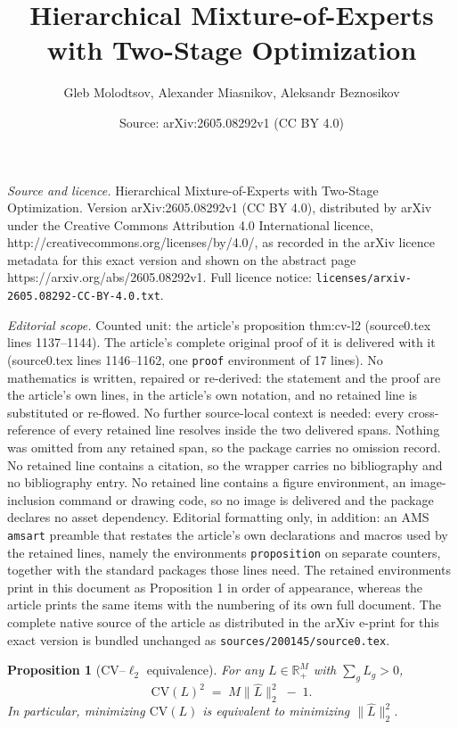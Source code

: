 \documentclass[10pt,a4paper]{amsart}
\title{Hierarchical Mixture-of-Experts with Two-Stage Optimization}
\author{Gleb Molodtsov, Alexander Miasnikov, Aleksandr Beznosikov}
\date{Source: arXiv:2605.08292v1 (CC BY 4.0)}
\newtheorem{proposition}{Proposition}
\begin{document}
\maketitle

\noindent\emph{Source and licence.} Hierarchical Mixture-of-Experts with Two-Stage Optimization. Version arXiv:2605.08292v1 (CC BY 4.0), distributed by arXiv under the Creative Commons Attribution 4.0 International licence, http://creativecommons.org/licenses/by/4.0/, as recorded in the arXiv licence metadata for this exact version and shown on the abstract page https://arxiv.org/abs/2605.08292v1. Full licence notice: \texttt{licenses/arxiv-2605.08292-CC-BY-4.0.txt}.\par\smallskip

\noindent\textit{Editorial scope.} Counted unit: the article's proposition thm:cv-l2 (source0.tex lines 1137--1144). The article's complete original proof of it is delivered with it (source0.tex lines 1146--1162, one \texttt{proof} environment of 17 lines). No mathematics is written, repaired or re-derived: the statement and the proof are the article's own lines, in the article's own notation, and no retained line is substituted or re-flowed.  No further source-local context is needed: every cross-reference of every retained line resolves inside the two delivered spans.  Nothing was omitted from any retained span, so the package carries no omission record.  No retained line contains a citation, so the wrapper carries no bibliography and no bibliography entry.  No retained line contains a figure environment, an image-inclusion command or drawing code, so no image is delivered and the package declares no asset dependency.  Editorial formatting only, in addition: an AMS \texttt{amsart} preamble that restates the article's own declarations and macros used by the retained lines, namely the environments \texttt{proposition} on separate counters, together with the standard packages those lines need.  The retained environments print in this document as Proposition 1 in order of appearance, whereas the article prints the same items with the numbering of its own full document.  The complete native source of the article as distributed in the arXiv e-print for this exact version is bundled unchanged as \texttt{sources/200145/source0.tex}.
\begin{proposition}[CV--$\ell_2$ equivalence]
\label{thm:cv-l2}
For any $L\in\mathbb{R}_+^M$ with $\sum_g L_g>0$,
\[
\mathrm{CV}(L)^2 \;=\; M\bigl\|\widehat L\bigr\|_2^2 \;-\; 1.
\]
In particular, minimizing $\mathrm{CV}(L)$ is equivalent to minimizing $\|\widehat L\|_2^2$.
\end{proposition}
\end{document}
